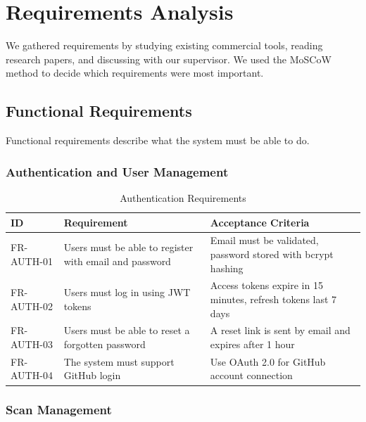 \documentclass[12pt,a4paper]{report}
\begin{document}
\section{Requirements Analysis}

We gathered requirements by studying existing commercial tools, reading research papers, and discussing with our supervisor. We used the MoSCoW method to decide which requirements were most important.

\subsection{Functional Requirements}

Functional requirements describe what the system must be able to do.

\subsubsection{Authentication and User Management}

\begin{table}[H]
\centering
\caption{Authentication Requirements}
\label{tab:auth_requirements}
\begin{tabular}{|p{2cm}|p{5cm}|p{5cm}|}
\hline
\textbf{ID} & \textbf{Requirement} & \textbf{Acceptance Criteria} \\
\hline
FR-AUTH-01 & Users must be able to register with email and password & Email must be validated, password stored with bcrypt hashing \\
\hline
FR-AUTH-02 & Users must log in using JWT tokens & Access tokens expire in 15 minutes, refresh tokens last 7 days \\
\hline
FR-AUTH-03 & Users must be able to reset a forgotten password & A reset link is sent by email and expires after 1 hour \\
\hline
FR-AUTH-04 & The system must support GitHub login & Use OAuth 2.0 for GitHub account connection \\
\hline
\end{tabular}
\end{table}

\subsubsection{Scan Management}
\end{document}
